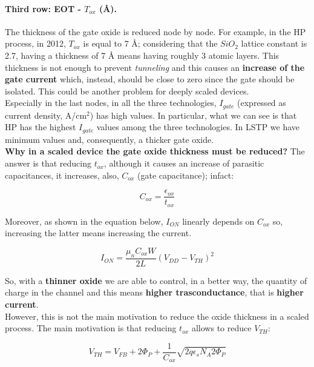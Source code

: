 \documentclass[a4paper, 12pt, twoside, openright]{report}
\begin{document}
\paragraph{Third row: EOT - $T_{ox}$ (\r{A}).} The thickness of the gate oxide is reduced node by node. For example, in the HP process, in 2012, $T_{ox}$ is equal to 7 \r{A}; considering that the $SiO_{2}$ lattice constant is 2.7, having a thickness of 7 \r{A} means having roughly 3 atomic layers. This thickness is not enough to prevent \emph{tunneling} and this causes an \textbf{increase of the gate current} which, instead, should be close to zero since the gate should be isolated. This could be another problem for deeply scaled devices.\\
Especially in the last nodes, in all the three technologies, $I_{gate}$ (expressed as current density, A/cm$^{2}$) has high values. In particular, what we can see is that HP has the highest $I_{gate}$ values among the three technologies. In LSTP we have minimum values and, consequently, a thicker gate oxide.\\
\textbf{Why in a scaled device the gate oxide thickness must be reduced?} The answer is that reducing $t_{ox}$, although it causes an increase of parasitic capacitances, it increases, also, $C_{ox}$ (gate capacitance); infact:

\begin{equation}
C_{ox} = \frac{\epsilon_{ox}}{t_{ox}}
\label{}
\end{equation}

Moreover, as shown in the equation below, $I_{ON}$ linearly depends on $C_{ox}$ so, increasing the latter means increasing the current.

\begin{equation}
I_{ON} = \frac{\mu_n C_{ox} W}{2 L} (V_{DD} - V_{TH})^2
\label{}
\end{equation}

So, with a \textbf{thinner oxide} we are able to control, in a better way, the quantity of charge in the channel and this means \textbf{higher trasconductance}, that is \textbf{higher current}.\\
However, this is not the main motivation to reduce the oxide thickness in a scaled process. The main motivation is that reducing $t_{ox}$ allows to reduce $V_{TH}$:

\begin{equation}
V_{TH} = V_{FB} + 2 \Phi_{P} + \frac{1}{C_{ox}} \sqrt{2 q \epsilon_s N_A 2 \Phi_{P}}
\label{V_th}
\end{equation}
\end{document}
